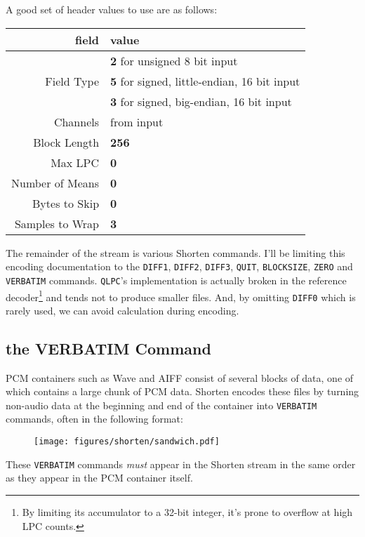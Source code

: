 A good set of header values to use are as follows:
\begin{table}[h]
\begin{tabular}{|r|l|}
\hline
field & value \\
\hline
& \textbf{2} for unsigned 8 bit input \\
Field Type & \textbf{5} for signed, little-endian, 16 bit input \\
& \textbf{3} for signed, big-endian, 16 bit input \\
Channels & from input \\
Block Length & \textbf{256} \\
Max LPC & \textbf{0} \\
Number of Means & \textbf{0} \\
Bytes to Skip & \textbf{0} \\
Samples to Wrap & \textbf{3} \\
\hline
\end{tabular}
\end{table}
\par
\noindent
The remainder of the stream is various Shorten commands.
I'll be limiting this encoding documentation to the \texttt{DIFF1},
\texttt{DIFF2}, \texttt{DIFF3}, \texttt{QUIT}, \texttt{BLOCKSIZE},
\texttt{ZERO} and \texttt{VERBATIM} commands.
\texttt{QLPC}'s implementation is actually broken in the reference
decoder\footnote{By limiting its accumulator to a 32-bit integer,
it's prone to overflow at high LPC counts.} and tends not to
produce smaller files.
And, by omitting \texttt{DIFF0} which is rarely used,
we can avoid  calculation during encoding.

\pagebreak

\subsection{the VERBATIM Command}

PCM containers such as Wave and AIFF consist of
several blocks of data, one of which contains a large chunk of
PCM data.
Shorten encodes these files by turning non-audio data at
the beginning and end of the container into \texttt{VERBATIM} commands,
often in the following format:
\begin{figure}[h]
\texttt{[image: figures/shorten/sandwich.pdf]}
\end{figure}
\par
\noindent
These \texttt{VERBATIM} commands \textit{must} appear in
the Shorten stream in the same order as they appear in the
PCM container itself.

